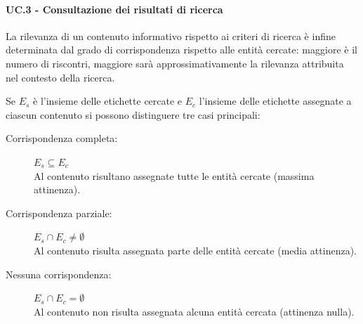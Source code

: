 \paragraph{UC.3 - Consultazione dei risultati di ricerca}
La rilevanza di un contenuto informativo rispetto ai criteri di ricerca è infine determinata dal grado di corrispondenza rispetto alle entità cercate: maggiore è il numero di riscontri, maggiore sarà approssimativamente la rilevanza attribuita nel contesto della ricerca.

Se $E_s$ è l'insieme delle etichette cercate e $E_c$ l'insieme delle etichette assegnate a ciascun contenuto si possono distinguere tre casi principali:
\begin{description}
\item[Corrispondenza completa:] $E_s \subseteq E_c$ \hfill \\
Al contenuto risultano assegnate tutte le entità cercate (massima attinenza).
\item[Corrispondenza parziale:] $E_s \cap E_c \neq \emptyset$ \hfill \\
Al contenuto risulta assegnata parte delle entità cercate (media attinenza).
\item[Nessuna corrispondenza:] $E_s \cap E_c = \emptyset$\hfill \\
Al contenuto non risulta assegnata alcuna entità cercata (attinenza nulla).
\end{description}
